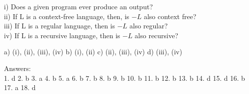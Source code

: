\documentclass[11pt]{article}
\begin{document}
\hspace*{0.5cm} i) Does a given program ever produce an output?\\
\hspace*{0.5cm} ii) If L is a context-free language, then, is $-L$ also context free?\\
\hspace*{0.5cm} iii) If L is a regular language, then is $-L$ also regular?\\
\hspace*{0.5cm} iv) If L is a recursive language, then is $-L$ also recursive?\\
\vspace*{0.1cm}

\hspace*{0.5cm} a) (i), (ii), (iii), (iv)   \vspace*{0.1cm}  b) (i), (ii)  \vspace*{0.1cm} c) (ii), (iii), (iv)   \vspace*{0.1cm}  d) (iii), (iv)\\
\vspace*{0.3cm}

\hspace*{-0.5cm}
Answers:\\
\hspace*{0.2cm} 1. d   \hspace*{0.5cm}  2. b  \hspace*{0.5cm}  3. a   \hspace*{0.5cm}  4. b   \hspace*{0.5cm}  5. a   \hspace*{0.5cm}  6. b  \hspace*{0.5cm}  7. b  \hspace*{0.5cm} 8. b   \hspace*{0.5cm} 9. b
\hspace*{0.5cm} 10. b  \hspace*{0.5cm} 11. b  \hspace*{0.5cm} 12. b   \hspace*{0.5cm} 13. b   \hspace*{0.5cm} 14. d   \hspace*{0.5cm}  15. d   \hspace*{0.5cm} 16. b  \hspace*{0.5cm} 17. a  \hspace*{0.5cm} 18. d\\

\vspace*{0.4cm}
\end{document}
